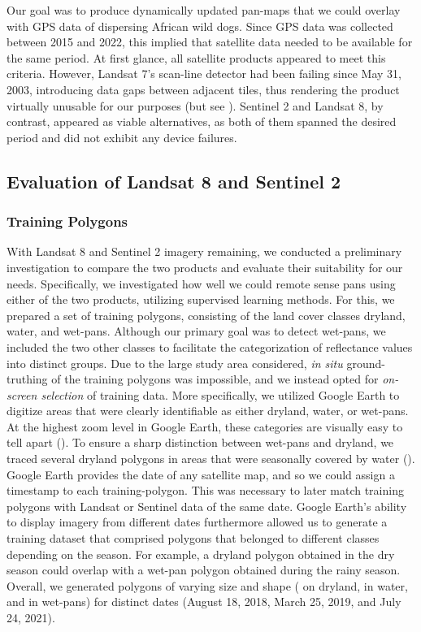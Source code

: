\documentclass[abstract=on,10pt,a4paper,bibliography=totocnumbered]{article}
\newcommand{\inputy}[1]{\unskip}
\begin{document}
\noindent Our goal was to produce dynamically updated pan-maps that we could
overlay with GPS data of dispersing African wild dogs. Since GPS data was
collected between 2015 and 2022, this implied that satellite data needed to be
available for the same period. At first glance, all satellite products appeared
to meet this criteria. However, Landsat 7's scan-line detector had been failing
since May 31, 2003, introducing data gaps between adjacent tiles, thus rendering
the product virtually unusable for our purposes (but see \citealp{Storey.2005}).
Sentinel 2 and Landsat 8, by contrast, appeared as viable alternatives, as both
of them spanned the desired period and did not exhibit any device failures.

\subsection{Evaluation of Landsat 8 and Sentinel 2}
\subsubsection{Training Polygons}

With Landsat 8 and Sentinel 2 imagery remaining, we conducted a preliminary
investigation to compare the two products and evaluate their suitability for our
needs. Specifically, we investigated how well we could remote sense pans using
either of the two products, utilizing supervised learning methods. For this, we
prepared a set of training polygons, consisting of the land cover classes
dryland, water, and wet-pans. Although our primary goal was to detect wet-pans,
we included the two other classes to facilitate the categorization of
reflectance values into distinct groups. Due to the large study area considered,
\textit{in situ} ground-truthing of the training polygons was impossible, and we
instead opted for \textit{on-screen selection} of training data. More
specifically, we utilized Google Earth to digitize areas that were clearly
identifiable as either dryland, water, or wet-pans. At the highest zoom level in
Google Earth, these categories are visually easy to tell apart
(). To ensure a sharp distinction between wet-pans and dryland,
we traced several dryland polygons in areas that were seasonally covered by
water (). Google Earth provides the date of any satellite map,
and so we could assign a timestamp to each training-polygon. This was necessary
to later match training polygons with Landsat or Sentinel data of the same date.
Google Earth's ability to display imagery from different dates furthermore
allowed us to generate a training dataset that comprised polygons that belonged
to different classes depending on the season. For example, a dryland polygon
obtained in the dry season could overlap with a wet-pan polygon obtained during
the rainy season. Overall, we generated \inputy{GeneralMetrics/TrainingTotal}
polygons of varying size and shape (\inputy{GeneralMetrics/TrainingDryland} on
dryland, \inputy{GeneralMetrics/TrainingWater} in water, and
\inputy{GeneralMetrics/TrainingWetpan} in wet-pans) for
\inputy{GeneralMetrics/TrainingDates} distinct dates (August 18, 2018, March 25,
2019, and July 24, 2021).
\end{document}
